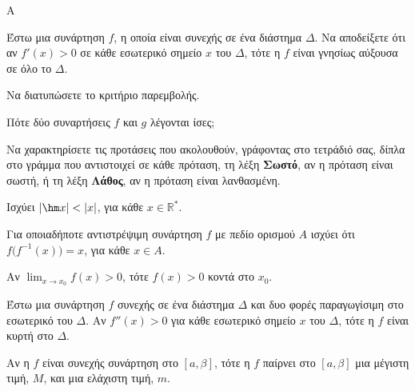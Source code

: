 \begin{thema}{Α}
\begin{erwthma}
    \item Έστω μια συνάρτηση $f$, η οποία είναι συνεχής σε ένα διάστημα $\Delta$. Να αποδείξετε ότι αν $f'(x) > 0$ σε κάθε εσωτερικό σημείο $x$ του $\Delta$, τότε η $f$ είναι γνησίως αύξουσα σε όλο το $\Delta$. 

    \item Να διατυπώσετε το κριτήριο παρεμβολής. 

    \item Πότε δύο συναρτήσεις $f$ και $g$ λέγονται ίσες; 

    \item Να χαρακτηρίσετε τις προτάσεις που ακολουθούν, γράφοντας στο τετράδιό σας, δίπλα στο γράμμα που αντιστοιχεί σε κάθε πρόταση, τη λέξη \textbf{Σωστό}, αν η πρόταση είναι σωστή, ή τη λέξη \textbf{Λάθος}, αν η πρόταση είναι λανθασμένη.
    \begin{alist}
        \item Ισχύει $|\hm x| < |x|$, για κάθε $x \in \mathbb{R}^*$.

        \item Για οποιαδήποτε αντιστρέψιμη συνάρτηση $f$ με πεδίο ορισμού $A$ ισχύει ότι $f\bigl(f^{-1}(x)\bigr) = x$, για κάθε $x \in A$.

        \item Αν $\displaystyle\lim_{x \to x_0} f(x) > 0$, τότε $f(x) > 0$ κοντά στο $x_0$.

        \item Έστω μια συνάρτηση $f$ συνεχής σε ένα διάστημα $\Delta$ και δυο φορές παραγωγίσιμη στο εσωτερικό του $\Delta$. Αν $f''(x) > 0$ για κάθε εσωτερικό σημείο $x$ του $\Delta$, τότε η $f$ είναι κυρτή στο $\Delta$.

        \item Αν η $f$ είναι συνεχής συνάρτηση στο $[a, \beta]$, τότε η $f$ παίρνει στο $[a, \beta]$ μια μέγιστη τιμή, $M$, και μια ελάχιστη τιμή, $m$.
    \end{alist}
\end{erwthma}
\end{thema}

